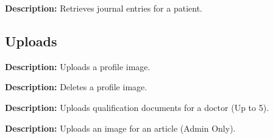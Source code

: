 \documentclass{article}
\begin{document}
\begin{tcolorbox}[title=\textcolor{accent}{GET} /api/session-tools/journal/patient/:patientId]
\textbf{Description:} Retrieves journal entries for a patient.
\end{tcolorbox}

\subsection{Uploads}

\begin{tcolorbox}[title=\textcolor{accent}{POST} /api/upload/profile-image]
\textbf{Description:} Uploads a profile image.
\end{tcolorbox}

\begin{tcolorbox}[title=\textcolor{accent}{DELETE} /api/upload/profile-image/:publicId]
\textbf{Description:} Deletes a profile image.
\end{tcolorbox}

\begin{tcolorbox}[title=\textcolor{accent}{POST} /api/upload/doctor-documents]
\textbf{Description:} Uploads qualification documents for a doctor (Up to 5).
\end{tcolorbox}

\begin{tcolorbox}[title=\textcolor{accent}{POST} /api/upload/article-image]
\textbf{Description:} Uploads an image for an article (Admin Only).
\end{tcolorbox}
\end{document}

